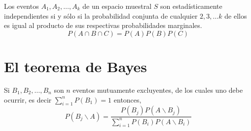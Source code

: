 \begin{tcolorbox}[colframe = white]
    \begin{def.} Los eventos $A_1,A_2,\ldots, A_k$ de un espacio muestral $S$ son estadísticamente independientes si y sólo si la probabilidad conjunta de cualquier $2,3,\ldots k$ de ellos es igual al producto de sus respectivas probabilidades marginales.
	$$P(A\cap B \cap C) = P(A)P(B)P(C)$$
    \end{def.}
\end{tcolorbox}

\section{El teorema de Bayes}

\begin{teo} Si $B_1,B_2,\ldots, B_n$ son $n$ eventos mutuamente excluyentes, de los cuales uno debe ocurrir, es decir $\sum_{i=1}^n P(B_1) = 1$ entonces,
    \begin{equation}
	P(B_j \backslash A) = \dfrac{P(B_j)P(A\backslash B_j)}{\sum\limits_{i=1}^n P(B_i)P(A\backslash B_i)}
    \end{equation}
\end{teo}



